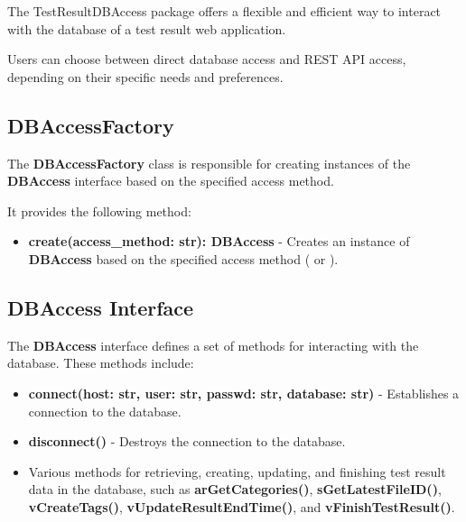 



The TestResultDBAccess package offers a flexible and efficient way to interact 
with the database of a test result web application. 

Users can choose between direct database access and REST API access, 
depending on their specific needs and preferences.

\subsection{DBAccessFactory}

The \textbf{DBAccessFactory} class is responsible for creating instances of the 
\textbf{DBAccess} interface based on the specified access method. 

It provides the following method:

\begin{itemize}
    \item \textbf{create(access\_method: str): DBAccess} - Creates an instance 
          of \textbf{DBAccess} based on the specified access method 
          ( or ).
\end{itemize}

\subsection{DBAccess Interface}

The \textbf{DBAccess} interface defines a set of methods for interacting with 
the database. These methods include:

\begin{itemize}
    \item \textbf{connect(host: str, user: str, passwd: str, database: str)} - 
          Establishes a connection to the database.
    \item \textbf{disconnect()} - Destroys the connection to the database.
    \item Various methods for retrieving, creating, updating, and finishing test 
          result data in the database, such as \textbf{arGetCategories()}, 
          \textbf{sGetLatestFileID()}, \textbf{vCreateTags()}, 
          \textbf{vUpdateResultEndTime()}, and \textbf{vFinishTestResult()}.
\end{itemize}

